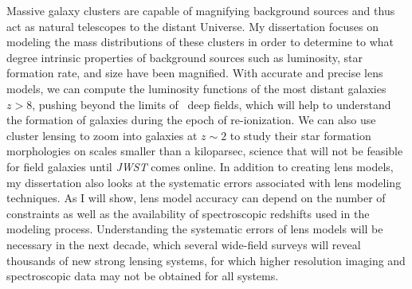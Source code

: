 Massive galaxy clusters are capable of magnifying background sources and thus act as natural telescopes to the distant Universe. My dissertation focuses on modeling the mass distributions of these clusters in order to determine to what degree intrinsic properties of background sources such as luminosity, star formation rate, and size have been magnified. With accurate and precise lens models, we can compute the luminosity functions of the most distant galaxies $z>8$, pushing beyond the limits of \hst\ deep fields, which will help to understand the formation of galaxies during the epoch of re-ionization. We can also use cluster lensing to zoom into galaxies at $z\sim2$ to study their star formation morphologies on scales smaller than a kiloparsec, science that will not be feasible for field galaxies until {\it JWST} comes online. In addition to creating lens models, my dissertation also looks at the systematic errors associated with lens modeling techniques. As I will show, lens model accuracy can depend on the number of constraints as well as the availability of spectroscopic redshifts used in the modeling process. Understanding the systematic errors of lens models will be necessary in the next decade, which several wide-field surveys will reveal thousands of new strong lensing systems, for which higher resolution imaging and spectroscopic data may not be obtained for all systems.